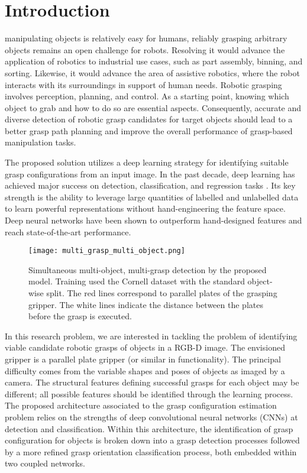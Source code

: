 \documentclass[letterpaper, 10 pt, journal, twoside]{IEEEtran}
\begin{document}
\section{Introduction}
 manipulating objects is relatively easy for humans, reliably grasping
arbitrary objects remains an open challenge for robots.  Resolving it
would advance the application of robotics to industrial use cases, such
as part assembly, binning, and sorting. Likewise, it would
advance the area of assistive robotics, where the robot interacts with its
surroundings in support of human needs.  Robotic grasping involves
perception, planning, and control. As a starting point, knowing which
object to grab and how to do so are essential aspects.  
Consequently, accurate and diverse detection of robotic grasp candidates
for target objects should lead to a better grasp path planning and
improve the overall performance of grasp-based manipulation tasks.

The proposed solution utilizes a deep learning strategy for identifying
suitable grasp configurations from an input image.  
In the past decade, deep learning has achieved major success on detection,
classification, and regression tasks
\cite{bo2013unsupervised,krizhevsky2012imagenet,ngiam2011multimodal}.
Its key strength is the ability to leverage large quantities of labelled and
unlabelled data to learn powerful representations without hand-engineering
the feature space. 
Deep neural networks have been shown to outperform hand-designed
features and reach state-of-the-art performance. 
\begin{figure}[t]
    \centering
    \texttt{[image: multi\_grasp\_multi\_object.png]}
\caption{Simultaneous multi-object, multi-grasp detection by the proposed 
    model. Training used the Cornell dataset with the standard object-wise 
    split. The red lines correspond to parallel plates of the grasping gripper.
    The white lines indicate the distance between the plates before the
    grasp is executed.}
\end{figure}

In this research problem, we are interested in tackling the problem of
identifying viable candidate robotic grasps of objects in a RGB-D image. 
The envisioned gripper is a parallel plate gripper 
(or similar in functionality).
The principal difficulty comes from the variable shapes and poses of 
objects as imaged by a camera.
The structural features defining successful grasps for each object may be
different; all possible features should be identified through the
learning process.
The proposed architecture associated to the grasp configuration estimation
problem relies on the strengths of deep convolutional neural networks
(CNNs) at detection and classification. Within this architecture,
the identification of grasp configuration for objects is broken down into a
grasp detection processes followed by a more refined grasp orientation
classification process, both embedded within two coupled networks.  
\end{document}
